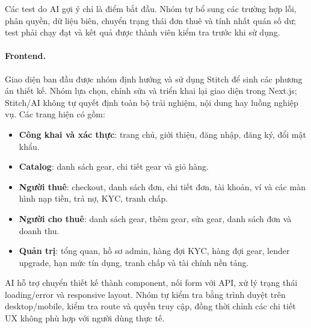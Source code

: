 Các test do AI gợi ý chỉ là điểm bắt đầu. Nhóm tự bổ sung các trường hợp lỗi,
phân quyền, dữ liệu biên, chuyển trạng thái đơn thuê và tính nhất quán số dư;
test phải chạy đạt và kết quả được thành viên kiểm tra trước khi sử dụng.

\paragraph{Frontend.}
Giao diện ban đầu được nhóm định hướng và sử dụng Stitch để sinh các phương án
thiết kế. Nhóm lựa chọn, chỉnh sửa và triển khai lại giao diện trong Next.js;
Stitch/AI không tự quyết định toàn bộ trải nghiệm, nội dung hay luồng nghiệp vụ.
Các trang hiện có gồm:
\begin{itemize}
    \item \textbf{Công khai và xác thực}: trang chủ, giới thiệu, đăng nhập,
    đăng ký, đổi mật khẩu.
    \item \textbf{Catalog}: danh sách gear, chi tiết gear và giỏ hàng.
    \item \textbf{Người thuê}: checkout, danh sách đơn, chi tiết đơn, tài
    khoản, ví và các màn hình nạp tiền, trả nợ, KYC, tranh chấp.
    \item \textbf{Người cho thuê}: danh sách gear, thêm gear, sửa gear, danh
    sách đơn và doanh thu.
    \item \textbf{Quản trị}: tổng quan, hồ sơ admin, hàng đợi KYC, hàng đợi
    gear, lender upgrade, hạn mức tín dụng, tranh chấp và tài chính nền tảng.
\end{itemize}

AI hỗ trợ chuyển thiết kế thành component, nối form với API, xử lý trạng thái
loading/error và responsive layout. Nhóm tự kiểm tra bằng trình duyệt trên
desktop/mobile, kiểm tra route và quyền truy cập, đồng thời chỉnh các chi tiết
UX không phù hợp với người dùng thực tế.

